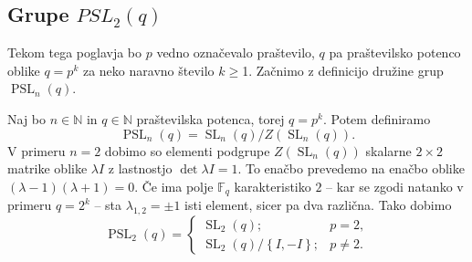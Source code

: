 




\subsection{Grupe $PSL_2(q)$}\label{sec_grupe_psl2q}

Tekom tega poglavja bo $p$ vedno označevalo praštevilo, $q$ pa praštevilsko potenco oblike $q = p^{k}$ za neko naravno število $k \ge $1. Začnimo z definicijo družine grup $\operatorname{PSL}_n(q)$.

\begin{definicija}\label{def_pslnq_in_psl2q}
    Naj bo $n \in \mathbb{N}$ in $q \in \mathbb{N}$ praštevilska potenca, torej $q = p^{k}$. Potem definiramo \begin{equation*}
        \operatorname{PSL}_n(q) = {\operatorname{SL}_n(q)} / {Z(\operatorname{SL}_n(q))}.
     \end{equation*}   
    V primeru $n = 2$ dobimo so elementi podgrupe $Z(\operatorname{SL}_n(q))$ skalarne $2 \times 2$ matrike oblike $\lambda I$ z lastnostjo $\det \lambda I = 1$. To enačbo prevedemo na enačbo oblike $(\lambda - 1)(\lambda + 1) = 0$.
    Če ima polje $\mathbb{F}_q$ karakteristiko $2$ -- kar se zgodi natanko v primeru $q = 2^{k}$ -- sta $\lambda_{1,2} = \pm 1$ isti element, sicer pa dva različna. Tako dobimo
    \begin{equation*}
                \operatorname{PSL}_2(q) = \begin{cases}
                    \operatorname{SL}_2(q); & p = 2,  \\
                    {\operatorname{SL}_2(q)} / {\left\{ I, -I \right\} }; & p \neq 2.
                \end{cases}
             \end{equation*}   
    \end{definicija}
    

